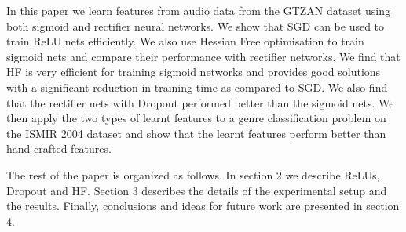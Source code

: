 \documentclass{article}
\begin{document}
In this paper we learn features from audio data from the GTZAN dataset using both sigmoid and rectifier neural networks. We show that SGD can be used to train ReLU nets efficiently. We also use Hessian Free optimisation to train sigmoid nets and compare their performance with rectifier networks. We find that HF is very efficient for training sigmoid networks and provides good solutions with a significant reduction in training time as compared to SGD. We also find that the rectifier nets with Dropout performed better than the sigmoid nets. We then apply the two types of learnt features to a genre classification problem on the ISMIR 2004 dataset and show that the learnt features perform better than hand-crafted features. 

The rest of the paper is organized as follows. In section 2 we describe ReLUs, Dropout and HF. Section 3 describes the details of the experimental setup and the results. Finally, conclusions and ideas for future work are presented in section 4. 



\end{document}
